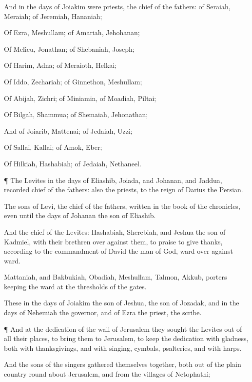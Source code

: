 {And in the
days of
Joiakim were
priests, the
chief of the
fathers: of
Seraiah,
Meraiah; of
Jeremiah,
Hananiah;

Of
Ezra,
Meshullam; of
Amariah,
Jehohanan;

Of
Melicu,
Jonathan; of
Shebaniah,
Joseph;

Of
Harim,
Adna; of
Meraioth,
Helkai;

Of
Iddo,
Zechariah; of
Ginnethon,
Meshullam;

Of
Abijah,
Zichri; of
Miniamin, of
Moadiah,
Piltai;

Of
Bilgah,
Shammua; of
Shemaiah,
Jehonathan;

And of
Joiarib,
Mattenai; of
Jedaiah,
Uzzi;

Of
Sallai,
Kallai; of
Amok,
Eber;

Of
Hilkiah,
Hashabiah; of
Jedaiah,
Nethaneel.


\par }{\PP {}¶ The
Levites in the
days of
Eliashib,
Joiada, and
Johanan, and
Jaddua,
{}
recorded
chief of the
fathers: also the
priests, to the
reign of
Darius the
Persian.

The
sons of
Levi, the
chief of the
fathers,
{}
written in the
book of the
chronicles, even until the
days of
Johanan the
son of
Eliashib.

And the
chief of the
Levites:
Hashabiah,
Sherebiah, and
Jeshua the
son of
Kadmiel, with their
brethren over against them, to
praise
{} to give
thanks, according to the
commandment of
David the
man of
God,
ward over
against
ward.

Mattaniah, and
Bakbukiah,
Obadiah,
Meshullam,
Talmon,
Akkub,
{}
porters
keeping the
ward at the
thresholds of the
gates.

These
{} in the
days of
Joiakim the
son of
Jeshua, the
son of
Jozadak, and in the
days of
Nehemiah the
governor, and of
Ezra the
priest, the
scribe.


\par }{\PP {}¶ And at the
dedication of the
wall of
Jerusalem they
sought the
Levites out of all their
places, to
bring them to
Jerusalem, to
keep the
dedication with
gladness, both with
thanksgivings, and with
singing,
{}
cymbals,
psalteries, and with
harps.

And the
sons of the
singers gathered themselves
together, both out of the plain
country round
about
Jerusalem, and from the
villages of
Netophathi;

}
